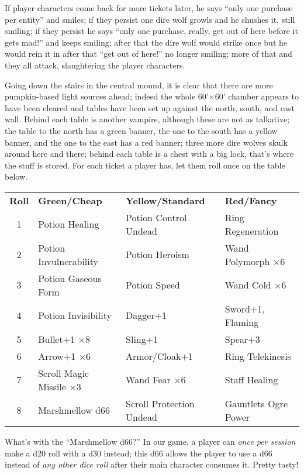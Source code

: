 If player characters come back for more tickets later, he says ``only one
purchase per entity'' and smiles; if they persist one dire wolf growls and he
shushes it, still smiling; if they persist he says ``only one purchase, really,
get out of here before it gets mad!'' and keeps smiling; after that the dire
wolf would strike once but he would rein it in after that ``get out of here!''
no longer smiling; more of that and they all attack, slaughtering the player
characters.

Going down the stairs in the central mound, it is clear that there are more
pumpkin-based light sources ahead; indeed the whole 60'\(\times\)60' chamber
appears to have been cleared and tables have been set up against the north,
south, and east wall. Behind each table is another vampire, although these are
not as talkative; the table to the north has a green banner, the one to the
south has a yellow banner, and the one to the east has a red banner; three more
dire wolves skulk around here and there; behind each table is a chest with a
big lock, that's where the stuff is stored. For each ticket a player has, let
them roll once on the table below.

\begin{tabularx}{\columnwidth}{cZZZ}
\textbf{Roll} & \textbf{Green/Cheap} & \textbf{Yellow/Standard} & \textbf{Red/Fancy}\\
1 & Potion Healing                   & Potion Control Undead    & Ring Regeneration\\
2 & Potion Invulnerability           & Potion Heroism           & Wand Polymorph \(\times\)6\\
3 & Potion Gaseous Form              & Potion Speed             & Wand Cold \(\times\)6\\
4 & Potion Invisibility              & Dagger+1                 & Sword+1, Flaming\\
5 & Bullet+1 \(\times\)8             & Sling+1                  & Spear+3\\
6 & Arrow+1 \(\times\)6              & Armor/Cloak+1            & Ring Telekinesis\\
7 & Scroll Magic Missile \(\times\)3 & Wand Fear \(\times\)6    & Staff Healing\\
8 & Marshmellow d66                  & Scroll Protection Undead & Gauntlets Ogre Power\\
\end{tabularx}

What's with the ``Marshmellow d66?'' In our game, a player can \emph{once per
session} make a d20 roll with a d30 instead; this d66 allows the player to use
a d66 instead of \emph{any other dice roll} after their main character consumes
it. Pretty tasty!

